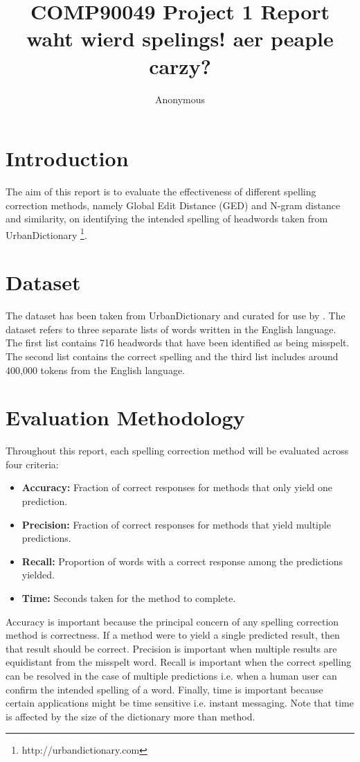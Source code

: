 \documentclass[11pt]{article}
\title{COMP90049 Project 1 Report \\
waht wierd spelings! aer peaple carzy?}
\author{Anonymous}
\begin{document}
\maketitle



\section{Introduction}

The aim of this report is to evaluate the effectiveness of different spelling correction methods, namely Global Edit Distance (GED) and N-gram distance and similarity, on identifying the intended spelling of headwords taken from UrbanDictionary \footnote{http://urbandictionary.com}.

\section{Dataset}
The dataset has been taken from UrbanDictionary and curated for use by . The dataset refers to three separate lists of words written in the English language. The first list contains 716 headwords that have been identified as being misspelt. The second list contains the correct spelling and the third list includes around 400,000 tokens from the English language.


\section{Evaluation Methodology}
Throughout this report, each spelling correction method will be evaluated across four criteria:
\begin{itemize}
	\item \textbf{Accuracy:} Fraction of correct responses for methods that only yield one prediction.
	\item \textbf{Precision:} Fraction of correct responses for methods that yield multiple predictions.
	\item \textbf{Recall:} Proportion of words with a correct response among the predictions yielded.
	\item \textbf{Time:} Seconds taken for the method to complete.
\end{itemize}
Accuracy is important because the principal concern of any spelling correction method is correctness. If a method were to yield a single predicted result, then that result should be correct. Precision is important when multiple results are equidistant from the misspelt word. Recall is important when the correct spelling can be resolved in the case of multiple predictions i.e. when a human user can confirm the intended spelling of a word. Finally, time is important because certain applications might be time sensitive i.e. instant messaging. Note that time is affected by the size of the dictionary more than method.
\end{document}
